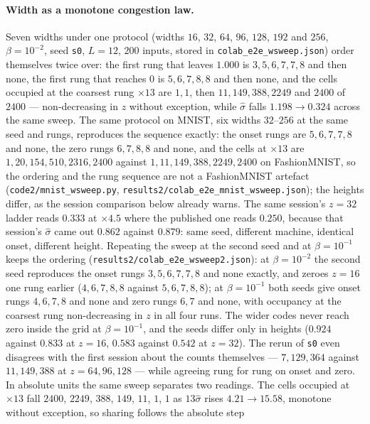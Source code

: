 \documentclass[11pt]{article}
\begin{document}
\paragraph{Width as a monotone congestion law.}
Seven widths under one protocol (widths $16$, $32$, $64$, $96$, $128$, $192$ and $256$,
$\beta=10^{-2}$, seed \texttt{s0}, $L=12$, $200$ inputs, stored in
\texttt{colab\_e2e\_wsweep.json}) order themselves twice
over: the first rung that leaves $1.000$ is $3,5,6,7,7,8$ and then none, the first rung that reaches
$0$ is $5,6,7,8,8$ and then none, and the cells occupied at the coarsest rung $\times13$ are $1,1$,
then $11,149,388,2249$ and $2400$ of $2400$ --- non-decreasing in $z$ without exception, while
$\hat\sigma$ falls $1.198\to0.324$ across the same sweep. The same protocol on MNIST, six widths
$32$--$256$ at the same seed and rungs, reproduces the sequence exactly: the onset rungs are
$5,6,7,7,8$ and none, the zero rungs $6,7,8,8$ and none, and the cells at $\times13$ are
$1,20,154,510,2316,2400$ against $1,11,149,388,2249,2400$ on FashionMNIST, so the ordering and the
rung sequence are not a FashionMNIST artefact (\texttt{code2/mnist\_wsweep.py},
\texttt{results2/colab\_e2e\_mnist\_wsweep.json}); the heights differ, as the session comparison
below already warns. The same session's $z=32$ ladder reads
$0.333$ at $\times4.5$ where the published one reads $0.250$, because that session's
$\hat\sigma$ came out $0.862$ against $0.879$: same seed, different machine, identical onset,
different height. Repeating the sweep at the second seed and at $\beta=10^{-1}$ keeps the ordering
(\texttt{results2/colab\_e2e\_wsweep2.json}): at $\beta=10^{-2}$ the second seed reproduces the
onset rungs $3,5,6,7,7,8$ and none exactly, and zeroes $z=16$ one rung earlier ($4,6,7,8,8$ against
$5,6,7,8,8$); at $\beta=10^{-1}$ both seeds give onset rungs $4,6,7,8$ and none and zero rungs $6,7$
and none, with occupancy at the coarsest rung non-decreasing in $z$ in all four runs. The wider
codes never reach zero inside the grid at $\beta=10^{-1}$, and the seeds differ only in heights
($0.924$ against $0.833$ at $z=16$, $0.583$ against $0.542$ at $z=32$). The rerun of \texttt{s0} even
disagrees with the first session about the counts themselves --- $7,129,364$ against $11,149,388$ at
$z=64,96,128$ --- while agreeing rung for rung on onset and zero. In
absolute units the same sweep separates two readings. The cells occupied at $\times13$ fall $2400$,
$2249$, $388$, $149$, $11$, $1$, $1$ as $13\hat\sigma$ rises $4.21\to15.58$, monotone without
exception, so sharing follows the absolute step
\end{document}
